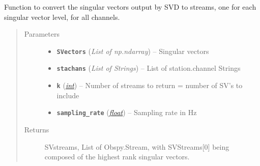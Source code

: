 \documentclass[a4paper,10pt,english]{sphinxmanual}
\begin{document}
\begin{fulllineitems}
\label{submodules/utils.clustering:clustering.SVD_2_stream}
Function to convert the singular vectors output by SVD to streams, one for
each singular vector level, for all channels.
\begin{quote}\begin{description}
\item[{Parameters}] \leavevmode\begin{itemize}
\item {} 
\textbf{\texttt{SVectors}} (\emph{List of np.ndarray}) -- Singular vectors

\item {} 
\textbf{\texttt{stachans}} (\emph{List of Strings}) -- List of station.channel Strings

\item {} 
\textbf{\texttt{k}} (\href{https://docs.python.org/library/functions.html\#int}{\emph{int}}) -- Number of streams to return = number of SV's to include

\item {} 
\textbf{\texttt{sampling\_rate}} (\href{https://docs.python.org/library/functions.html\#float}{\emph{float}}) -- Sampling rate in Hz

\end{itemize}

\item[{Returns}] \leavevmode
SVstreams, List of Obspy.Stream, with SVStreams{[}0{]} being
composed of the highest rank singular vectors.

\end{description}\end{quote}

\end{fulllineitems}

\end{document}
